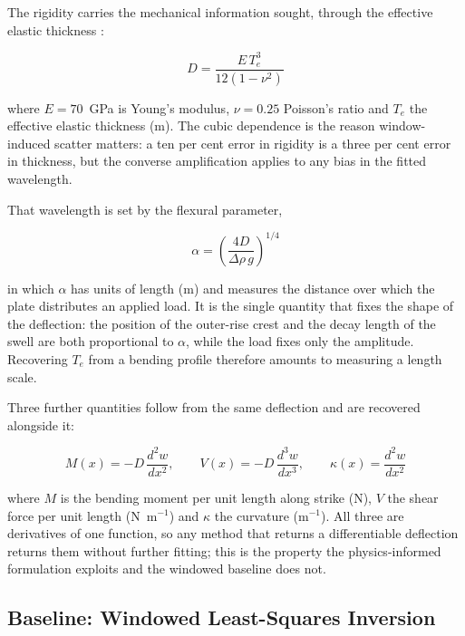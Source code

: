 \documentclass[final]{agujournal2019}
\begin{document}
The rigidity carries the mechanical information sought, through the effective
elastic thickness \cite{Kirby2022Isostasy}:
\begin{linenomath*}
\begin{equation}
  D = \frac{E\,T_{e}^{3}}{12\left(1-\nu^{2}\right)}
  \label{eq:rigidity}
\end{equation}
\end{linenomath*}
where $E = 70$~GPa is Young's modulus, $\nu = 0.25$ Poisson's ratio and $T_{e}$
the effective elastic thickness (m). The cubic dependence is the reason
window-induced scatter matters: a ten per cent error in rigidity is a three per
cent error in thickness, but the converse amplification applies to any bias in
the fitted wavelength.

That wavelength is set by the flexural parameter,
\begin{linenomath*}
\begin{equation}
  \alpha = \left(\frac{4D}{\Delta\rho\,g}\right)^{1/4}
  \label{eq:alpha}
\end{equation}
\end{linenomath*}
in which $\alpha$ has units of length (m) and measures the distance over which
the plate distributes an applied load. It is the single quantity that fixes the
shape of the deflection: the position of the outer-rise crest and the decay
length of the swell are both proportional to $\alpha$, while the load fixes only
the amplitude. Recovering $T_{e}$ from a bending profile therefore amounts to
measuring a length scale.

Three further quantities follow from the same deflection and are recovered
alongside it:
\begin{linenomath*}
\begin{equation}
  M(x) = -D\,\frac{d^{2}w}{dx^{2}}, \qquad
  V(x) = -D\,\frac{d^{3}w}{dx^{3}}, \qquad
  \kappa(x) = \frac{d^{2}w}{dx^{2}}
  \label{eq:derived}
\end{equation}
\end{linenomath*}
where $M$ is the bending moment per unit length along strike (N), $V$ the shear
force per unit length (N~m$^{-1}$) and $\kappa$ the curvature (m$^{-1}$). All
three are derivatives of one function, so any method that returns a
differentiable deflection returns them without further fitting; this is the
property the physics-informed formulation exploits and the windowed baseline
does not.

\subsection{Baseline: Windowed Least-Squares Inversion}\label{sec:baseline}
\end{document}
